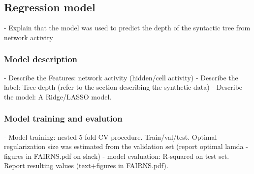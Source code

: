 \subsection{Regression model}
- Explain that the model was used to predict the depth of the syntactic tree from network activity
\subsubsection{Model description}
- Describe the Features: network activity (hidden/cell activity)
- Describe the label: Tree depth (refer to the section describing the synthetic data)
- Describe the model: A Ridge/LASSO model.
\subsubsection{Model training and evalution}
- Model training: nested 5-fold CV procedure. Train/val/test. Optimal regularization size was estimated from the validation set (report optimal lamda - figures in FAIRNS.pdf on slack)
- model evaluation: R-squared on test set. Report resulting values (text+figures in FAIRNS.pdf). 


